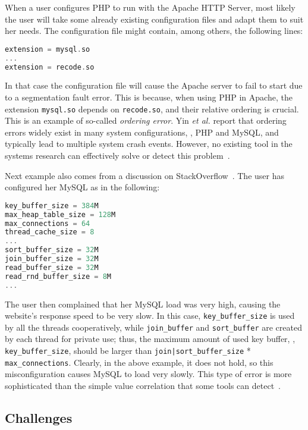 When a user configures PHP  to run with the Apache HTTP Server, most 
likely the user will take some already existing configuration files and 
adapt them to suit her needs. The configuration file might contain, among 
others,  the following lines:
\begin{lstlisting}[language=C, xleftmargin=.01\textwidth]
extension = mysql.so
...
extension = recode.so
\end{lstlisting} 
In that case the configuration file will cause the Apache server to 
fail to start due to a segmentation fault error. 
This is because, when using PHP in Apache, the extension {\tt mysql.so} 
depends on {\tt recode.so}, and their relative ordering
is crucial. This is an example of so-called {\em ordering error}.
Yin {\em et al.} report that ordering errors widely exist in
many system configurations, \eg, PHP and MySQL,
and typically lead to multiple system crash events.
However, no existing tool in the systems research can effectively solve 
or detect this problem~\cite{zhang14encore, xu15systems, xu13do}.


Next example also comes from a discussion on 
StackOverflow~\cite{correlation}.
The user has configured her MySQL as in the following:
\begin{lstlisting}[language=C, xleftmargin=.01\textwidth]
key_buffer_size = 384M
max_heap_table_size = 128M
max_connections = 64
thread_cache_size = 8
...
sort_buffer_size = 32M
join_buffer_size = 32M
read_buffer_size = 32M
read_rnd_buffer_size = 8M
...
\end{lstlisting} 
The user then complained that her MySQL load was very high, causing the website's
response speed to be very slow.
In this case, {\tt key\_buffer\_size} is used by all the threads
cooperatively, while {\tt join\_buffer} and {\tt sort\_buffer} are 
created by each thread for private use; thus, the maximum amount
of used key buffer, \ie, {\tt key\_buffer\_size}, should be larger than 
{\tt join|sort\_buffer\_size} * {\tt max\_connections}. 
Clearly, in the above example, it does not hold, 
so this misconfiguration causes MySQL to load very slowly.
This type of error is more sophisticated than the simple value correlation that some tools can detect~\cite{yin11anempirical, zhang14encore}.


\subsection{Challenges}
\label{sec:intro-chal}

